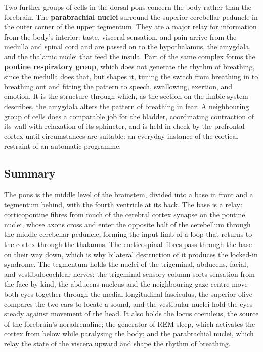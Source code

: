 \documentclass[11pt]{article}
\begin{document}
Two further groups of cells in the dorsal pons concern the body rather than the forebrain. The \textbf{parabrachial nuclei} surround the superior cerebellar peduncle in the outer corner of the upper tegmentum. They are a major relay for information from the body's interior: taste, visceral sensation, and pain arrive from the medulla and spinal cord and are passed on to the hypothalamus, the amygdala, and the thalamic nuclei that feed the insula. Part of the same complex forms the \textbf{pontine respiratory group}, which does not generate the rhythm of breathing, since the medulla does that, but shapes it, timing the switch from breathing in to breathing out and fitting the pattern to speech, swallowing, exertion, and emotion. It is the structure through which, as the section on the limbic system describes, the amygdala alters the pattern of breathing in fear. A neighbouring group of cells does a comparable job for the bladder, coordinating contraction of its wall with relaxation of its sphincter, and is held in check by the prefrontal cortex until circumstances are suitable: an everyday instance of the cortical restraint of an automatic programme.

\subsection{Summary}

The pons is the middle level of the brainstem, divided into a base in front and a tegmentum behind, with the fourth ventricle at its back. The base is a relay: corticopontine fibres from much of the cerebral cortex synapse on the pontine nuclei, whose axons cross and enter the opposite half of the cerebellum through the middle cerebellar peduncle, forming the input limb of a loop that returns to the cortex through the thalamus. The corticospinal fibres pass through the base on their way down, which is why bilateral destruction of it produces the locked-in syndrome. The tegmentum holds the nuclei of the trigeminal, abducens, facial, and vestibulocochlear nerves: the trigeminal sensory column sorts sensation from the face by kind, the abducens nucleus and the neighbouring gaze centre move both eyes together through the medial longitudinal fasciculus, the superior olive compares the two ears to locate a sound, and the vestibular nuclei hold the eyes steady against movement of the head. It also holds the locus coeruleus, the source of the forebrain's noradrenaline; the generator of REM sleep, which activates the cortex from below while paralysing the body; and the parabrachial nuclei, which relay the state of the viscera upward and shape the rhythm of breathing.
\end{document}
